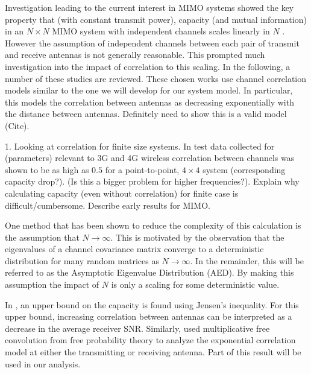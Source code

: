 \par
Investigation leading to the current interest in MIMO systems showed the key property that (with constant transmit power), capacity (and mutual information) in an $N \times N$ MIMO system with independent channels scales linearly in $N$ \cite{foschini1998limits}. However the assumption of independent channels between each pair of transmit and receive antennas is not generally reasonable. This prompted much investigation into the impact of correlation to this scaling. In the following, a number of these studies are reviewed. These chosen works use channel correlation models similar to the one we will develop for our system model. In particular, this models the correlation between antennas as decreasing  exponentially with the distance between antennas. Definitely need to show this is a valid model (Cite).
\par
1. Looking at correlation for finite size systems.
In test data collected for (parameters) relevant to 3G and 4G wireless correlation between channels was shown to be as high as $0.5$ for a point-to-point, $4 \times 4$ system \cite{martin2000multiple} (corresponding capacity drop?). (Is this a bigger problem for higher frequencies?).
Explain why calculating capacity (even without correlation) for finite case is difficult/cumbersome. Describe early results for MIMO.
\par
One method that has been shown to reduce the complexity of this calculation is the assumption that $N \rightarrow \infty$. 
This is motivated by the observation that the eigenvalues of a channel covariance matrix converge to a deterministic distribution for many random 
matrices as  $N \rightarrow \infty$. In the remainder, this will be referred to as the Asymptotic Eigenvalue Distribution (AED). 
By making this assumption the impact of $N$ is only a scaling for some deterministic value. 
\par
In \cite{loyka2001channel}, an upper bound on the capacity is found using Jensen's inequality. For this upper bound, increasing correlation between antennas can be interpreted as a decrease in the average receiver SNR. 
Similarly, \cite{skupch2005free} used multiplicative free convolution from free probability theory to analyze the exponential correlation model at either the transmitting or receiving antenna. Part of this result will be used in our analysis. 

